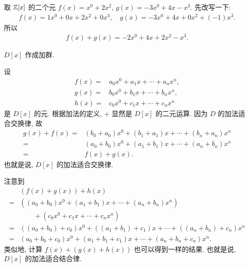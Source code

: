 \begin{example}
    取 $\mathbb{Z}[x]$ 的二个元 $f(x)=x^0 + 2x^2$, $g(x)=-3x^0 + 4x - x^3$. 先改写一下:
    \begin{align*}
        f(x) = 1x^0 + 0x + 2x^2 + 0x^3, \quad g(x) = -3x^0 + 4x + 0x^2 + (-1)x^3.
    \end{align*}
    所以
    \begin{align*}
        f(x) + g(x) = -2x^0 + 4x + 2x^2 - x^3.
    \end{align*}
\end{example}

\begin{proposition}
    $D[x]$ 作成加群.
\end{proposition}

\begin{pf}
    设
    \begin{align*}
        f(x) = {} & a_0 x^0 + a_1 x + \cdots + a_n x^n, \\
        g(x) = {} & b_0 x^0 + b_1 x + \cdots + b_n x^n, \\
        h(x) = {} & c_0 x^0 + c_1 x + \cdots + c_n x^n
    \end{align*}
    是 $D[x]$ 的元. 根据加法的定义, $+$ 显然是 $D[x]$ 的二元运算. 因为 $D$ 的加法适合交换律, 故
    \begin{align*}
        g(x) + f(x)
        = {} & (b_0 + a_0) x^0 + (b_1 + a_1) x + \cdots + (b_n + a_n) x^n \\
        = {} & (a_0 + b_0) x^0 + (a_1 + b_1) x + \cdots + (a_n + b_n) x^n \\
        = {} & f(x) + g(x).
    \end{align*}
    也就是说, $D[x]$ 的加法适合交换律.

    注意到
    \begin{align*}
             & (f(x) + g(x)) + h(x)                                                               \\
        = {} & ((a_0 + b_0) x^0 + (a_1 + b_1) x + \cdots + (a_n + b_n) x^n)                       \\
             & \qquad + (c_0 x^0 + c_1 x + \cdots + c_n x^n)                                      \\
        = {} & ((a_0 + b_0) + c_0) x^0 + ((a_1 + b_1) + c_1) x + \cdots + ((a_n + b_n) + c_n) x^n \\
        = {} & (a_0 + b_0 + c_0) x^0 + (a_1 + b_1 + c_1) x + \cdots + (a_n + b_n + c_n) x^n.
    \end{align*}
    类似地, 计算 $f(x) + (g(x) + h(x))$ 也可以得到一样的结果. 也就是说, $D[x]$ 的加法适合结合律.


\end{pf}
